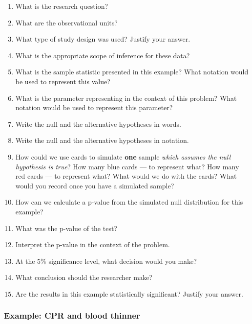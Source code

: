 \documentclass[
]{report}
\newcommand{\rgs}{\vspace{12pt}} %
\begin{document}
\begin{enumerate}
\def\labelenumi{\arabic{enumi}.}
\item
  What is the research question?
  \rgs
\item
  What are the observational units?
  \rgs
\item
  What type of study design was used? Justify your answer.
  \rgs
\item
  What is the appropriate scope of inference for these data?
  \rgs
\item
  What is the sample statistic presented in this example? What notation would be used to represent this value?
  \rgs
\item
  What is the parameter representing in the context of this problem? What notation would be used to represent this parameter?
  \rgs
  \rgs
\item
  Write the null and the alternative hypotheses in words.
  \rgs
  \rgs
\item
  Write the null and the alternative hypotheses in notation.
  \rgs
\item
  How could we use cards to simulate \textbf{one} sample \emph{which assumes the null hypothesis is true}? How many blue cards --- to represent what? How many red cards --- to represent what? What would we do with the cards? What would you record once you have a simulated sample?
  \rgs
  \rgs
  \rgs
\item
  How can we calculate a p-value from the simulated null distribution for this example?
  \rgs
  \rgs
\item
  What was the p-value of the test?
  \rgs
\item
  Interpret the p-value in the context of the problem.
  \rgs
  \rgs
\item
  At the 5\% significance level, what decision would you make?
  \rgs
\item
  What conclusion should the researcher make?
  \rgs
\item
  Are the results in this example statistically significant? Justify your answer.
  \rgs
\end{enumerate}

\hypertarget{example-cpr-and-blood-thinner}{%
\subsubsection*{Example: CPR and blood thinner}\label{example-cpr-and-blood-thinner}}
\end{document}
